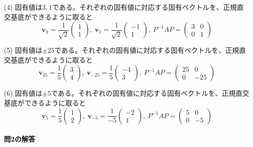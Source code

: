 \noindent (4) 固有値は$3, 1$である。それぞれの固有値に対応する固有ベクトルを、正規直交基底ができるように取ると
\[
\bm{v}_{3} =
\frac{1}{\sqrt{2}}
\begin{pmatrix}
1 \\
1
\end{pmatrix}, \ 
\bm{v}_{1} =
\frac{1}{\sqrt{2}}
\begin{pmatrix}
-1 \\
1
\end{pmatrix}, \ 
P^{-1} A P 
= 
\begin{pmatrix}
3 & 0 \\
0 & 1
\end{pmatrix}
\]

\noindent (5) 固有値は$\pm25$である。それぞれの固有値に対応する固有ベクトルを、正規直交基底ができるように取ると
\[
\bm{v}_{25} =
\frac{1}{5}
\begin{pmatrix}
3 \\
4
\end{pmatrix}, \ 
\bm{v}_{-25} =
\frac{1}{5}
\begin{pmatrix}
-4 \\
3
\end{pmatrix}, \ 
P^{-1} A P 
= 
\begin{pmatrix}
25 & 0 \\
0 & -25
\end{pmatrix}
\]

\noindent (6) 固有値は$\pm5$である。それぞれの固有値に対応する固有ベクトルを、正規直交基底ができるように取ると
\[
\bm{v}_{5} =
\frac{1}{5}
\begin{pmatrix}
1 \\
2
\end{pmatrix}, \ 
\bm{v}_{-5} =
\frac{1}{-5}
\begin{pmatrix}
-2 \\
1
\end{pmatrix}, \ 
P^{-1} A P 
= 
\begin{pmatrix}
5 & 0 \\
0 & -5
\end{pmatrix}
\]

\paragraph{問2の解答}

